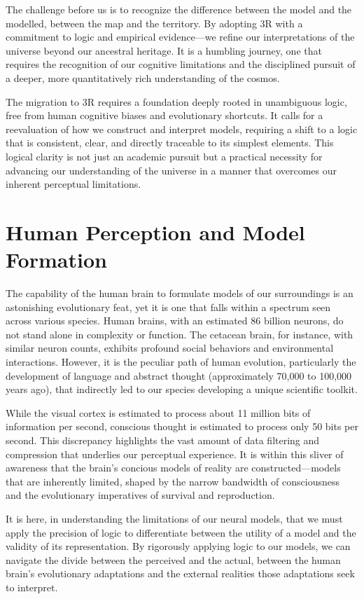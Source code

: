 \documentclass[12pt]{article}
\begin{document}
The challenge before us is to recognize the difference between the model and the modelled, between the map and the territory. By adopting 3R with a commitment to logic and empirical evidence—we refine our interpretations of the universe beyond our ancestral heritage. It is a humbling journey, one that requires the recognition of our cognitive limitations and the disciplined pursuit of a deeper, more quantitatively rich understanding of the cosmos.

The migration to 3R requires a foundation deeply rooted in unambiguous logic, free from human cognitive biases and evolutionary shortcuts. It calls for a reevaluation of how we construct and interpret models, requiring a shift to a logic that is consistent, clear, and directly traceable to its simplest elements. This logical clarity is not just an academic pursuit but a practical necessity for advancing our understanding of the universe in a manner that overcomes our inherent perceptual limitations.

\section*{Human Perception and Model Formation}
The capability of the human brain to formulate models of our surroundings is an astonishing evolutionary feat, yet it is one that falls within a spectrum seen across various species. Human brains, with an estimated 86 billion neurons, do not stand alone in complexity or function. The cetacean brain, for instance, with similar neuron counts, exhibits profound social behaviors and environmental interactions. However, it is the peculiar path of human evolution, particularly the development of language and abstract thought (approximately 70,000 to 100,000 years ago), that indirectly led to our species developing a unique scientific toolkit.

While the visual cortex is estimated to process about 11 million bits of information per second, conscious thought is estimated to process only 50 bits per second. This discrepancy highlights the vast amount of data filtering and compression that underlies our perceptual experience. It is within this sliver of awareness that the brain's concious models of reality are constructed—models that are inherently limited, shaped by the narrow bandwidth of consciousness and the evolutionary imperatives of survival and reproduction.

It is here, in understanding the limitations of our neural models, that we must apply the precision of logic to differentiate between the utility of a model and the validity of its representation. By rigorously applying logic to our models, we can navigate the divide between the perceived and the actual, between the human brain's evolutionary adaptations and the external realities those adaptations seek to interpret.
\end{document}
